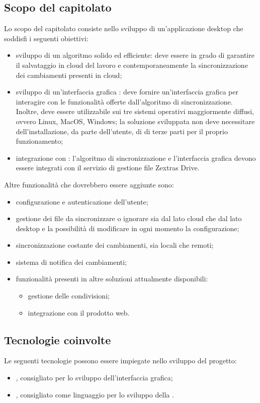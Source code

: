 \subsection{Scopo del capitolato}
Lo scopo del capitolato consiste nello sviluppo di un'applicazione desktop che soddisfi i seguenti obiettivi:
\begin{itemize}
	\item sviluppo di un algoritmo solido ed efficiente: deve essere in grado di garantire il salvataggio in cloud del lavoro e contemporaneamente la sincronizzazione dei cambiamenti presenti in cloud;
	\item sviluppo di un’interfaccia grafica : deve fornire un'interfaccia grafica per interagire con le funzionalità offerte dall'algoritmo di sincronizzazione. Inoltre, deve essere utilizzabile sui tre sistemi operativi maggiormente diffusi, ovvero Linux, MacOS, Windows; la soluzione sviluppata non deve necessitare dell'installazione, da parte dell'utente, di  di terze parti per il proprio funzionamento;
	\item integrazione con : l'algoritmo di sincronizzazione e l'interfaccia grafica devono essere integrati con il servizio di gestione file Zextras Drive.
\end{itemize}
Altre funzionalità che dovrebbero essere aggiunte sono:
\begin{itemize}
	\item configurazione e autenticazione dell'utente;
	\item gestione dei file da sincronizzare o ignorare sia dal lato cloud che dal lato desktop e la possibilità di modificare in ogni momento la configurazione;
	\item sincronizzazione costante dei cambiamenti, sia locali che remoti;
	\item sistema di notifica dei cambiamenti;
	\item funzionalità presenti in altre soluzioni attualmente disponibili:
	\begin{itemize}
		\item gestione delle condivisioni;
		\item integrazione con il prodotto web.
	\end{itemize}
\end{itemize}

\subsection{Tecnologie coinvolte}
Le seguenti tecnologie possono essere impiegate nello sviluppo del progetto:
\begin{itemize}
	\item {}, consigliato per lo sviluppo dell'interfaccia grafica;
	\item {}, consigliato come linguaggio per lo sviluppo della .
\end{itemize}

